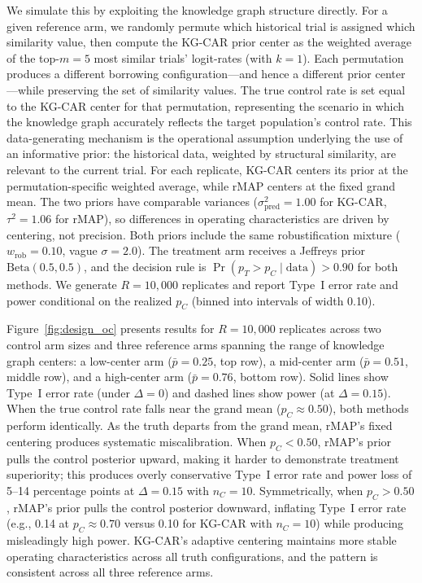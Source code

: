 \documentclass[12pt]{article}
\begin{document}
We simulate this by exploiting the knowledge graph structure directly. For a given reference arm, we randomly permute which historical trial is assigned which similarity value, then compute the KG-CAR prior center as the weighted average of the top-$m = 5$ most similar trials' logit-rates (with $k = 1$). Each permutation produces a different borrowing configuration---and hence a different prior center---while preserving the set of similarity values. The true control rate is set equal to the KG-CAR center for that permutation, representing the scenario in which the knowledge graph accurately reflects the target population's control rate. This data-generating mechanism is the operational assumption underlying the use of an informative prior: the historical data, weighted by structural similarity, are relevant to the current trial. For each replicate, KG-CAR centers its prior at the permutation-specific weighted average, while rMAP centers at the fixed grand mean. The two priors have comparable variances ($\sigma^2_{\text{pred}} = 1.00$ for KG-CAR, $\tau^2 = 1.06$ for rMAP), so differences in operating characteristics are driven by centering, not precision. Both priors include the same robustification mixture ($w_{\text{rob}} = 0.10$, vague $\sigma = 2.0$). The treatment arm receives a Jeffreys prior $\text{Beta}(0.5, 0.5)$, and the decision rule is $\Pr(p_T > p_C \mid \text{data}) > 0.90$ for both methods. We generate $R = 10{,}000$ replicates and report Type~I error rate and power conditional on the realized $p_C$ (binned into intervals of width 0.10).

Figure~\ref{fig:design_oc} presents results for $R = 10{,}000$ replicates across two control arm sizes and three reference arms spanning the range of knowledge graph centers: a low-center arm ($\bar{p} = 0.25$, top row), a mid-center arm ($\bar{p} = 0.51$, middle row), and a high-center arm ($\bar{p} = 0.76$, bottom row). Solid lines show Type~I error rate (under $\Delta = 0$) and dashed lines show power (at $\Delta = 0.15$). When the true control rate falls near the grand mean ($p_C \approx 0.50$), both methods perform identically. As the truth departs from the grand mean, rMAP's fixed centering produces systematic miscalibration. When $p_C < 0.50$, rMAP's prior pulls the control posterior upward, making it harder to demonstrate treatment superiority; this produces overly conservative Type~I error rate and power loss of 5--14 percentage points at $\Delta = 0.15$ with $n_C = 10$. Symmetrically, when $p_C > 0.50$, rMAP's prior pulls the control posterior downward, inflating Type~I error rate (e.g., 0.14 at $p_C \approx 0.70$ versus 0.10 for KG-CAR with $n_C = 10$) while producing misleadingly high power. KG-CAR's adaptive centering maintains more stable operating characteristics across all truth configurations, and the pattern is consistent across all three reference arms.
\end{document}
